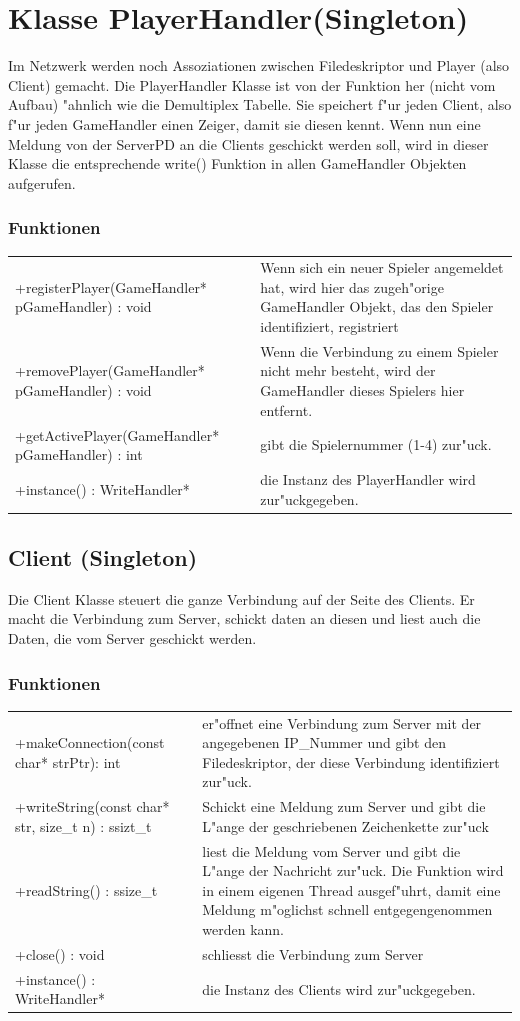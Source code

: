\section{Klasse PlayerHandler(Singleton)}
Im Netzwerk werden noch Assoziationen zwischen Filedeskriptor und Player (also Client) gemacht. Die PlayerHandler Klasse ist
von der Funktion her (nicht vom Aufbau) "ahnlich wie die Demultiplex Tabelle. Sie speichert f"ur jeden Client, also f"ur jeden GameHandler
einen Zeiger, damit sie diesen kennt. Wenn nun eine Meldung von der ServerPD an die Clients geschickt werden soll, wird in dieser Klasse
die entsprechende write() Funktion in allen GameHandler Objekten aufgerufen.
\subsubsection{Funktionen}
\begin{tabular}{p{50mm}p{90mm}}
	+registerPlayer(GameHandler* pGameHandler) : void & Wenn sich ein neuer Spieler angemeldet hat, wird hier das zugeh"orige GameHandler
	Objekt, das den Spieler identifiziert, registriert\\
	+removePlayer(GameHandler* pGameHandler) : void & Wenn die Verbindung zu einem Spieler nicht mehr besteht, wird der GameHandler dieses 
	Spielers hier entfernt.\\
	+getActivePlayer(GameHandler* pGameHandler) : int & gibt die Spielernummer (1-4) zur"uck. \\
	+instance() : WriteHandler* & die Instanz des PlayerHandler wird zur"uckgegeben. \\
\end{tabular}


\subsection{Client (Singleton)}
Die Client Klasse steuert die ganze Verbindung auf der Seite des Clients. Er macht die Verbindung zum Server, schickt daten an diesen und liest 
auch die Daten, die vom Server geschickt werden.
\subsubsection{Funktionen}
\begin{tabular}{p{50mm}p{90mm}}
	+makeConnection(const char* strPtr): int & er"offnet eine Verbindung zum Server mit der angegebenen IP\_Nummer und gibt den 
	Filedeskriptor, der diese Verbindung identifiziert zur"uck. \\
	+writeString(const char* str, size\_t n) : ssizt\_t & Schickt eine Meldung zum Server und gibt die L"ange der geschriebenen Zeichenkette
	zur"uck\\
	+readString() : ssize\_t & liest die Meldung vom Server und gibt die L"ange der Nachricht zur"uck. Die Funktion wird in einem
	eigenen Thread ausgef"uhrt, damit eine Meldung m"oglichst schnell entgegengenommen werden kann.\\
	+close() : void & schliesst die Verbindung zum Server \\
	+instance() : WriteHandler* & die Instanz des Clients wird zur"uckgegeben. \\
\end{tabular}


